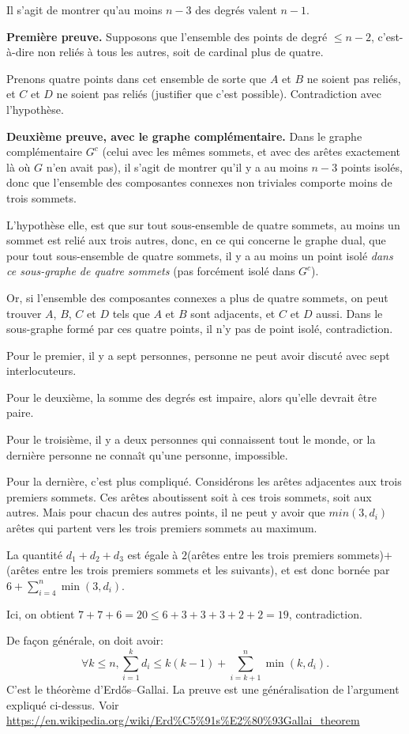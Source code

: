 \begin{Soln}{95}
Il s'agit de montrer qu'au moins $n-3$ des degrés valent $n-1$.

\textbf{Première preuve.} Supposons que l'ensemble des points de degré $\leq n-2$, c'est-à-dire non reliés à tous les autres, soit de cardinal plus de quatre.

Prenons quatre points dans cet ensemble de sorte que $A$ et $B$ ne soient pas reliés, et $C$ et $D$ ne soient pas reliés (justifier que c'est possible). Contradiction avec l'hypothèse.

\textbf{Deuxième preuve, avec le graphe complémentaire. } Dans le graphe complémentaire $G^c$ (celui avec les mêmes sommets, et avec des arêtes exactement là où $G$ n'en avait pas), il s'agit de montrer qu'il y a au moins $n-3$ points isolés, donc que l'ensemble des composantes connexes non triviales comporte moins de trois sommets.

L'hypothèse elle, est que sur tout sous-ensemble de quatre sommets, au moins un sommet est relié aux trois autres, donc, en ce qui concerne le graphe dual, que pour tout sous-ensemble de quatre sommets, il y a au moins un point isolé \emph{dans ce sous-graphe de quatre sommets} (pas forcément isolé dans $G^c$).

Or, si l'ensemble des composantes connexes a plus de quatre sommets, on peut trouver $A$, $B$, $C$ et $D$ tels que $A$ et $B$ sont adjacents, et $C$ et $D$ aussi. Dans le sous-graphe formé par ces quatre points, il n'y pas de point isolé, contradiction.

\end{Soln}
\begin{Soln}{96}
Pour le premier, il y a sept personnes, personne ne peut avoir discuté avec sept interlocuteurs.

Pour le deuxième, la somme des degrés est impaire, alors qu'elle devrait être paire.

Pour le troisième, il y a deux personnes qui connaissent tout le monde, or la dernière personne ne connaît qu'une personne, impossible.

Pour la dernière, c'est plus compliqué. Considérons les arêtes adjacentes aux trois premiers sommets. Ces arêtes aboutissent soit à ces trois sommets, soit aux autres. Mais pour chacun des autres points, il ne peut y avoir que $min(3,d_i)$ arêtes qui partent vers les trois premiers sommets au maximum.

La quantité $d_1+d_2+d_3$ est égale à $2$(arêtes entre les trois premiers sommets)$+$(arêtes entre les trois premiers sommets et les suivants), et est donc bornée par $6+\sum_{i=4}^n \min(3,d_i)$.

Ici, on obtient $7+7+6=20 \leq 6 + 3+3+3+2+2=19$, contradiction.

De façon générale, on doit avoir:
\[ \forall k\leq n, \sum_{i=1}^k d_i \leq k(k-1) + \sum_{i=k+1}^n \min(k,d_i).\]
C'est le théorème d'Erdős–Gallai. La preuve est une généralisation de l'argument expliqué ci-dessus. Voir \url{https://en.wikipedia.org/wiki/Erd%C5%91s%E2%80%93Gallai_theorem}
\end{Soln}
